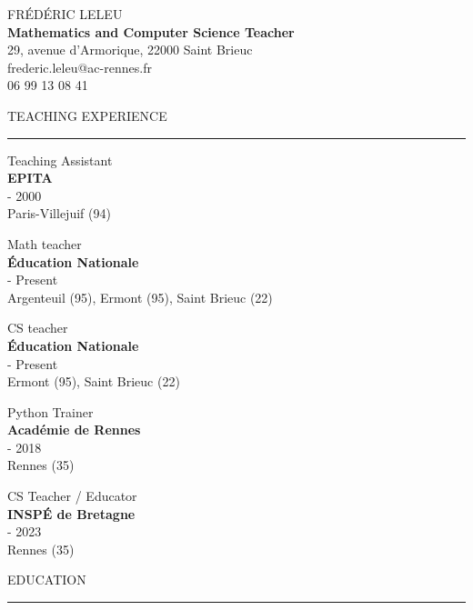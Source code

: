 \documentclass[12pt,a4paper,article,english,firamath]{nsi}
\begin{document}
{\Large\titlefont FRÉDÉRIC LELEU}\\
{\color{UGLiBlue}\textbf{Mathematics and Computer Science Teacher}}\\

{\color{UGLiBlue}\faEnvelope} 29, avenue d'Armorique, 22000 Saint Brieuc\\
{\color{UGLiBlue}\faAt} frederic.leleu@ac-rennes.fr\\
{\color{UGLiBlue}\faPhone*} 06 99 13 08 41\\



\begin{multicols}{2}
{\color{UGLiBlue}\large\titlefont TEACHING EXPERIENCE\\[-1em]\hrule}

\bigskip Teaching Assistant \\
{\color{UGLiBlue}\textbf{EPITA }}\\
{\color{lightgray} - 2000\\ \faMapMarker* Paris-Villejuif (94)}

\bigskip Math teacher \\
{\color{UGLiBlue}\textbf{Éducation Nationale}}\\
{\color{lightgray} - Present\\ \faMapMarker*\small Argenteuil (95), Ermont (95), Saint Brieuc (22)}

\bigskip CS teacher \\
{\color{UGLiBlue}\textbf{Éducation Nationale}}\\
{\color{lightgray} - Present\\ \faMapMarker* Ermont (95), Saint Brieuc (22)}

\bigskip Python Trainer \\
{\color{UGLiBlue}\textbf{Académie de Rennes}}\\
{\color{lightgray} - 2018\\ \faMapMarker* Rennes (35)}

\bigskip CS Teacher / Educator \\
{\color{UGLiBlue}\textbf{INSPÉ de Bretagne}}\\
{\color{lightgray} - 2023\\ \faMapMarker* Rennes (35)}



\columnbreak
{\color{UGLiBlue}\large\titlefont EDUCATION\\[-1em]\hrule}



\end{multicols}
\end{document}
